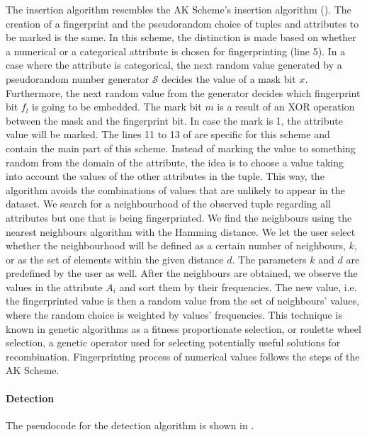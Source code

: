 The insertion algorithm resembles the AK Scheme's insertion algorithm ().
The creation of a fingerprint and the pseudorandom choice of tuples and attributes to be marked is the same.
In this scheme, the distinction is made based on whether a numerical or a categorical attribute is chosen for fingerprinting (line 5). 
In a case where the attribute is categorical, the next random value generated by a pseudorandom number generator $\mathcal{S}$ decides the value of a mask bit $x$. 
Furthermore, the next random value from the generator decides which fingerprint bit $f_l$ is going to be embedded. 
The mark bit $m$ is a result of an XOR operation between the mask and the fingerprint bit. 
In case the mark is 1, the attribute value will be marked. 
The lines 11 to 13 of  are specific for this scheme and contain the main part of this scheme.
Instead of marking the value to something random from the domain of the attribute, the idea is to choose a value taking into account the values of the other attributes in the tuple. 
This way, the algorithm avoids the combinations of values that are unlikely to appear in the dataset. 
We search for a neighbourhood of the observed tuple regarding all attributes but one that is being fingerprinted. 
We find the neighbours using the nearest neighbours algorithm with the Hamming distance. 
We let the user select whether the neighbourhood will be defined as a certain number of neighbours, $k$, or as the set of elements within the given distance $d$.
The parameters $k$ and $d$ are predefined by the user as well. 
After the neighbours are obtained, we observe the values in the attribute $A_i$ and sort them by their frequencies. 
The new value, i.e. the fingerprinted value is then a random value from the set of neighbours' values, where the random choice is weighted by values' frequencies. 
This technique is known in genetic algorithms as a fitness proportionate selection, or roulette wheel selection, a genetic operator used for selecting potentially useful solutions for recombination.
Fingerprinting process of numerical values follows the steps of the AK Scheme. 

\paragraph{Detection}
The pseudocode for the detection algorithm is shown in .

